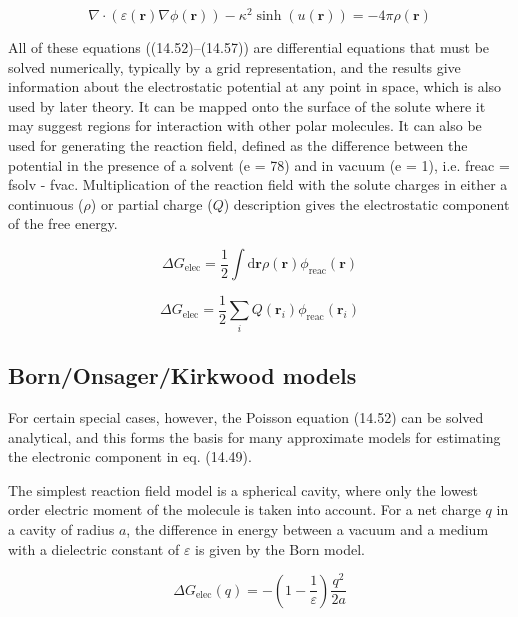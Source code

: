 \[
\nabla\cdot(\varepsilon(\mathbf{r})\nabla\phi(\mathbf{r}))-\kappa^{2}\sinh\left(u(\mathbf{r})\right)=-4\pi\rho(\mathbf{r})
\]


All of these equations ((14.52)–(14.57)) are differential equations
that must be solved numerically, typically by a grid representation,
and the results give information about the electrostatic potential
at any point in space, which is also used by later theory. It can
be mapped onto the surface of the solute where it may suggest regions
for interaction with other polar molecules. It can also be used for
generating the reaction field, defined as the difference between the
potential in the presence of a solvent (e = 78) and in vacuum (e =
1), i.e. freac = fsolv - fvac. Multiplication of the reaction field
with the solute charges in either a continuous ($\rho$) or partial
charge ($Q$) description gives the electrostatic component of the
free energy.

\begin{equation}
\Delta G_{\mathrm{elec}}=\frac{1}{2}\int\mathrm{d}\mathbf{r}\rho(\mathbf{r})\phi_{\mathrm{reac}}(\mathbf{r})
\end{equation}


\begin{equation}
\Delta G_{\mathrm{elec}}=\frac{1}{2}\sum_{i}Q(\mathbf{r}_{i})\phi_{\mathrm{reac}}(\mathbf{r}_{i})
\end{equation}



\subsection{Born/Onsager/Kirkwood models }

For certain special cases, however, the Poisson equation (14.52) can
be solved analytical, and this forms the basis for many approximate
models for estimating the electronic component in eq. (14.49).

The simplest reaction field model is a spherical cavity, where only
the lowest order electric moment of the molecule is taken into account.
For a net charge $q$ in a cavity of radius $a$, the difference in
energy between a vacuum and a medium with a dielectric constant of
$\varepsilon$ is given by the Born model.

\begin{equation}
\Delta G_{\mathrm{elec}}(q)=-\left(1-\frac{1}{\varepsilon}\right)\frac{q^{2}}{2a}
\end{equation}


